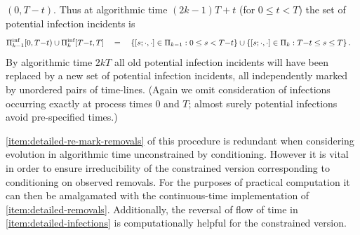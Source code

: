 \documentclass[]{article}
\newcommand{\Poisson}{\Pi}
\newcommand{\PoissonInf}{\Poisson^\textup{inf}}
\begin{document}
\begin{defn}
\begin{enumerate}
\((0,T{-}t)\).
Thus at algorithmic time \((2k{-}1)T+t\) (for \(0\leq t<T\)) the set of potential infection incidents is
\begin{align*}
\PoissonInf_{k-1}[0,T{-}t) &\cup \PoissonInf_k[T{-}t,T] \quad = \quad
\{[s;\cdot,\cdot]\in\Poisson_{k-1}: 0\leq s< T{-}t\}
\cup
\{[s;\cdot,\cdot]\in\Poisson_k: T{-}t \leq s\leq T\}
\,.
\end{align*}
By algorithmic time \(2kT\) all old
potential infection incidents will have been replaced by a new set of
potential infection incidents, 
all
independently marked by unordered pairs 
of time-lines.
(Again we omit consideration 
of infections occurring exactly at process times \(0\) and \(T\);
almost surely potential infections avoid pre-specified times.)
\end{enumerate}
\end{defn}

\ref{item:detailed-re-mark-removals}
of this procedure
is redundant when considering evolution in algorithmic time unconstrained
by conditioning. 
However it is vital in order to ensure irreducibility of the constrained version
corresponding to conditioning on observed removals. 
For the purposes of practical computation
it can then be amalgamated
with the continuous-time implementation of \ref{item:detailed-removals}.
Additionally,
the reversal of flow of time in
\ref{item:detailed-infections} is computationally helpful
for the 
constrained version.
\end{document}

